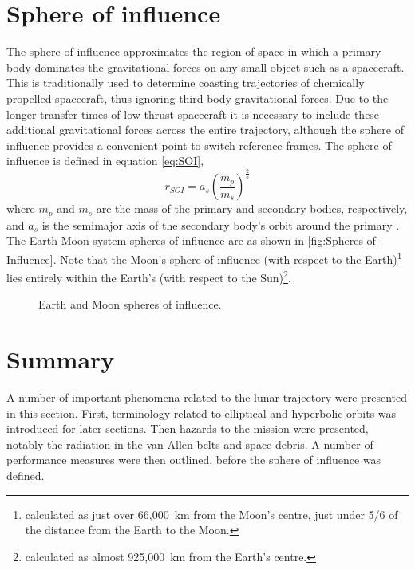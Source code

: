 \section{Sphere of influence} \label{sec:SOI}
The sphere of influence approximates the region of space in which a primary body dominates the gravitational forces on any small object such as a spacecraft. This is traditionally used to determine coasting trajectories of chemically propelled spacecraft, thus ignoring third-body gravitational forces. Due to the longer transfer times of low-thrust spacecraft it is necessary to include these additional gravitational forces across the entire trajectory, although the sphere of influence provides a convenient point to switch reference frames. The sphere of influence is defined in equation \eqref{eq:SOI},
\begin{equation}
r_{SOI}=a_{s}\left(\frac{m_{p}}{m_{s}}\right)^{\frac{2}{5}} \label{eq:SOI}
\end{equation}
where $m_{p}$ and $m_{s}$ are the mass of the primary and secondary bodies, respectively, and $a_{s}$ is the semimajor axis of the secondary body's orbit around the primary \parencite{Kemble2006}. The Earth-Moon system spheres of influence are as shown in \autoref{fig:Spheres-of-Influence}.
 Note that the Moon's sphere of influence (with respect to the Earth)\footnote{calculated as just over 66,000~km from the Moon's centre, just under 5/6 of the distance from the Earth to the Moon.} lies entirely within the Earth's (with respect to the Sun)\footnote{calculated as almost 925,000~km from the Earth's centre.}.

\begin{figure} [h]
\caption{Earth and Moon spheres of influence.} \label{fig:Spheres-of-Influence}
\centering
\def\svgwidth{\figurewidth}

\end{figure}

\section{Summary} \label{sec:Rocket-science-summary}

A number of important phenomena related to the lunar trajectory were presented in this section. First, terminology related to elliptical and hyperbolic orbits was introduced for later sections. Then hazards to the mission were presented, notably the radiation in the van Allen belts and space debris. A number of performance measures were then outlined, before the sphere of influence was defined.
